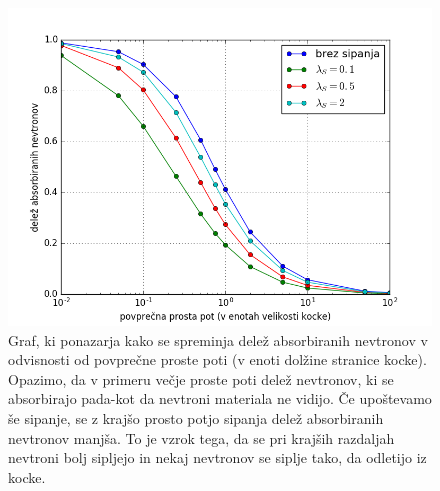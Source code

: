 \documentclass[slovene,11pt,a4paper]{article}
\numberwithin{equation}{section} %
\numberwithin{figure}{section} %
\numberwithin{table}{section} %
\begin{document}
\begin{figure}[!t]
\centering
\includegraphics[scale=0.7]{slike/delez_absorbiranih_nevtronov.png}
\caption{Graf, ki ponazarja kako se spreminja delež absorbiranih nevtronov v odvisnosti od povprečne proste poti (v enoti dolžine stranice kocke). Opazimo, da v primeru večje proste poti delež nevtronov, ki se absorbirajo pada-kot da nevtroni materiala ne vidijo. Če upoštevamo še sipanje, se z krajšo prosto potjo sipanja delež absorbiranih nevtronov manjša. To je vzrok tega, da se pri krajših razdaljah nevtroni bolj sipljejo in nekaj nevtronov se siplje tako, da odletijo iz kocke. }
\end{figure}

\FloatBarrier








\end{document}
